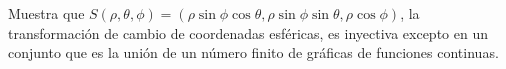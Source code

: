 Muestra que \( S(\rho, \theta, \phi) = (\rho \sin \phi \cos \theta, \rho \sin \phi \sin \theta, \rho \cos \phi) \), la transformación de cambio de coordenadas esféricas, es inyectiva excepto en un conjunto que es la unión de un número finito de gráficas de funciones continuas.
